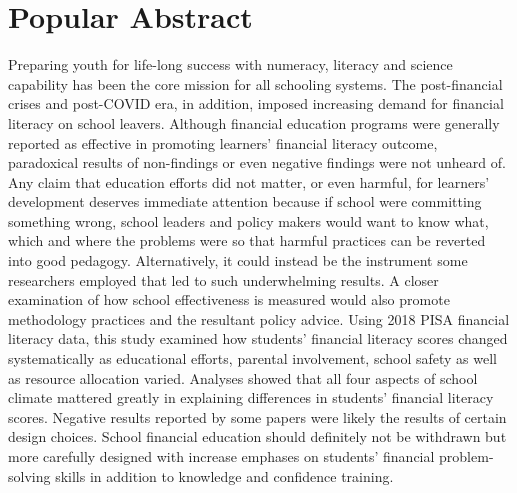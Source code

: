 \section*{Popular Abstract}

\noindent Preparing youth for life-long success with numeracy, literacy and science capability has been the core mission for all schooling systems. The post-financial crises and post-COVID era, in addition, imposed increasing demand for financial literacy on school leavers. Although financial education programs were generally reported as effective in promoting learners' financial literacy outcome, paradoxical results of non-findings or even negative findings were not unheard of. Any claim that education efforts did not matter, or even harmful, for learners' development deserves immediate attention because if school were committing something wrong, school leaders and policy makers would want to know what, which and where the problems were so that harmful practices can be reverted into good pedagogy. Alternatively, it could instead be the instrument some researchers employed that led to such underwhelming results. A closer examination of how school effectiveness is measured would also promote methodology practices and the resultant policy advice. Using 2018 PISA financial literacy data, this study examined how students' financial literacy scores changed systematically as educational efforts, parental involvement, school safety as well as resource allocation varied. Analyses showed that all four aspects of school climate mattered greatly in explaining differences in students' financial literacy scores. Negative results reported by some papers were likely the results of certain design choices. School financial education should definitely not be withdrawn but more carefully designed with increase emphases on students' financial problem-solving skills in addition to knowledge and confidence training.
